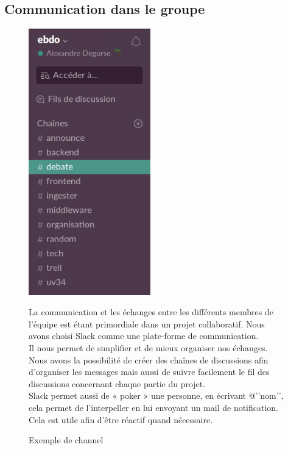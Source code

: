 \documentclass[a4paper]{article}
\begin{document}
\newpage
\subsection{Communication dans le groupe}
\begin{figure}[h]
	\begin{minipage}{.48\textwidth}
		\centering
		\includegraphics[width=200px]{./tmp/ChanSlack.png}
		\caption{Exemple de channel}
	\end{minipage}
	\begin{minipage}{.48\textwidth}

		La communication et les échanges entre les différents
		membres de l’équipe est étant primordiale dans un
		projet collaboratif. Nous avons choisi Slack comme une
		plate-forme de communication.
		\\

		Il nous permet de simplifier et de mieux organiser nos
		échanges. Nous avons la possibilité de créer des
		chaînes de discussions afin d’organiser les messages
		mais aussi de suivre facilement le fil des discussions
		concernant chaque partie du projet.
		\\

		Slack permet aussi de « poker » une personne, en
		écrivant @’’nom’’, cela permet de l’interpeller en lui
		envoyant un mail de notification. Cela est utile afin
		d’être réactif quand nécessaire.
	\end{minipage}
\end{figure}
\end{document}
